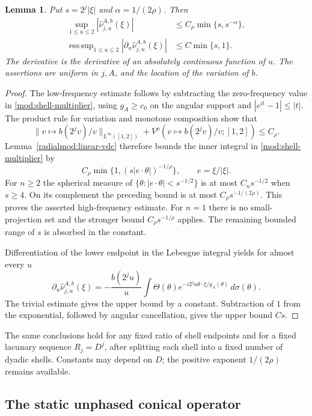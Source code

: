 \documentclass[11pt]{article}
\numberwithin{equation}{section}
\newtheorem{lemma}[theorem]{Lemma}
\theoremstyle{remark}
\theoremstyle{definition}
\DeclareMathOperator*{\esssup}{ess\,sup}
\begin{document}
\begin{lemma}\label{mod:shell-envelope}
Put $s=2^j|\xi|$ and $\alpha=1/(2\rho)$. Then
\begin{align}
 \sup_{1\le u\le2}|\widehat\nu^{A,b}_{j,u}(\xi)|
  &\le C_\rho\min\{s,s^{-\alpha}\},\label{mod:shell-envelope-eq}\\
 \esssup_{1\le u\le2}|\partial_u\widehat\nu^{A,b}_{j,u}(\xi)|
  &\le C\min\{s,1\}.
 \label{mod:shell-derivative-eq}
\end{align}
The derivative is the derivative of an absolutely continuous function
of $u$. The assertions are uniform in $j,A$, and the location of the
variation of $b$.
\end{lemma}
\begin{proof}
The low-frequency estimate follows by subtracting the zero-frequency
value in \eqref{mod:shell-multiplier}, using $g_A\ge c_0$ on the angular
support and $|e^{it}-1|\le|t|$. The product rule for variation and
monotone composition show that
\[
 \|v\mapsto b(2^jv)/v\|_{L^\infty([1,2])}
 +V^\rho(v\mapsto b(2^jv)/v;[1,2])\le C_\rho.
\]
Lemma~\ref{radialmod:linear-vdc} therefore bounds the inner integral in
\eqref{mod:shell-multiplier} by
\[
 C_\rho\min\{1,(s|e\cdot\theta|)^{-1/\rho}\},
 \qquad e=\xi/|\xi|.
\]
For $n\ge2$ the spherical measure of
$\{\theta:|e\cdot\theta|<s^{-1/2}\}$ is at most $C_ns^{-1/2}$ when
$s\ge4$. On its complement the preceding bound is at most
$C_\rho s^{-1/(2\rho)}$. This proves the asserted high-frequency
estimate. For $n=1$ there is no small-projection set and the stronger
bound $C_\rho s^{-1/\rho}$ applies. The remaining bounded range of $s$
is absorbed in the constant.

Differentiation of the lower endpoint in the Lebesgue integral yields
for almost every $u$
\[
 \partial_u\widehat\nu^{A,b}_{j,u}(\xi)
 =-\frac{b(2^ju)}u\int\Theta(\theta)
   e^{-i2^ju\theta\cdot\xi/g_A(\theta)}\,d\sigma(\theta).
\]
The trivial estimate gives the upper bound by a constant. Subtraction
of $1$ from the exponential, followed by angular cancellation, gives
the upper bound $Cs$.
\end{proof}

The same conclusions hold for any fixed ratio of shell endpoints and
for a fixed lacunary sequence $R_j=D^j$, after splitting each shell into
a fixed number of dyadic shells. Constants may depend on $D$; the
positive exponent $1/(2\rho)$ remains available.

\subsection{The static unphased conical operator}
\end{document}
